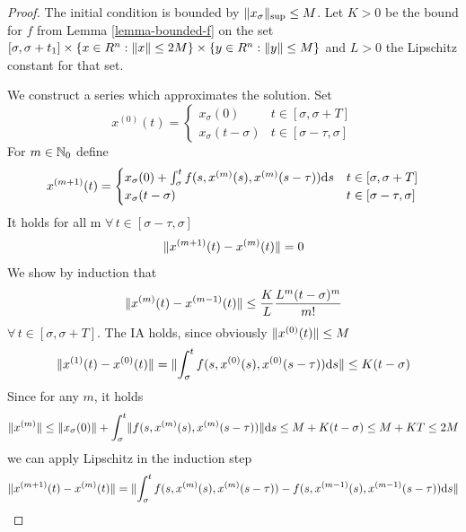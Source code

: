 \documentclass[10pt]{article}
\begin{document}
\begin{proof}
    The initial condition is bounded by $\lVert x_\sigma\rVert_{\text{\scriptsize{sup}}}\leq M$.
    Let $K>0$ be the bound for $f$ from Lemma \ref{lemma-bounded-f} on the set $[\sigma,\sigma+t_1] \times \{x\in R^n: \lVert x\rVert\leq 2M\}\times \{y\in R^n: \lVert y\rVert\leq M\}$ and $L>0$ the Lipschitz constant for that set.

    We construct a series which approximates the solution.
    Set
    \begin{equation}
        x^{(0)}(t)= \begin{cases}
            x_\sigma(0) & t\in [\sigma,\sigma+T]\\
            x_\sigma(t-\sigma) & t\in [\sigma-\tau,\sigma]
        \end{cases}
    \end{equation}
    For $m\in\mathbb{N}_0$ define
    \begin{equation}
        x^{(m+1)}(t)= \begin{cases}
            x_\sigma(0) + \int_\sigma^t f(s,x^{(m)}(s),x^{(m)}(s-\tau))\text{d}s & t\in [\sigma,\sigma+T]\\
            x_\sigma(t-\sigma) & t\in [\sigma-\tau,\sigma]
        \end{cases}
    \end{equation}
    It holds for all m $\forall\,t\in [\sigma-\tau,\sigma]$
    \begin{equation}
        \lVert x^{(m+1)}(t)-x^{(m)}(t)\rVert=0
    \end{equation}
    We show by induction that
    \begin{equation}
        \lVert x^{(m)}(t)-x^{(m-1)}(t)\rVert \leq \frac{K}{L}\frac{L^m (t-\sigma)^m}{m!}
    \end{equation}
    $\forall\,t\in [\sigma,\sigma+T]$.
    The IA holds, since obviously $\lVert x^{(0)}(t)\rVert\leq M$
    \begin{equation}
        \lVert x^{(1)}(t)-x^{(0)}(t)\rVert = \lVert\int_\sigma^t f(s,x^{(0)}(s),x^{(0)}(s-\tau))\text{d}s\rVert \leq K(t-\sigma)
    \end{equation}
    Since for any $m$, it holds
    \begin{equation}
        \lVert x^{(m)}\rVert\leq \lVert x_\sigma(0)\rVert + \int_\sigma^t \lVert f(s,x^{(m)}(s),x^{(m)}(s-\tau))\rVert\text{d}s
        \leq M + K(t-\sigma) \leq M+KT \leq 2M
    \end{equation}
    we can apply Lipschitz in the induction step
    \begin{align}
        \norm{x^{(m+1)}(t)-x^{(m)}(t)} &= \norm{\int_\sigma^t f(s,x^{(m)}(s),x^{(m)}(s-\tau)) - f(s,x^{(m-1)}(s),x^{(m-1)}(s-\tau))\dx{s}}\\

\end{align}
\end{proof}
\end{document}
